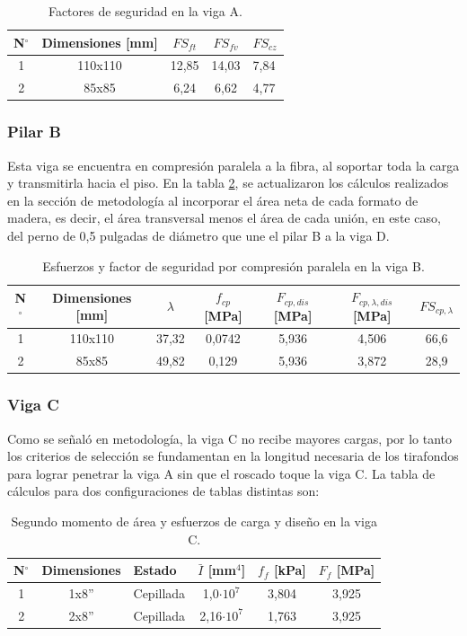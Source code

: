 \begin{table}[H]
\centering
\caption{Factores de seguridad en la viga A.}
\begin{tabular}{@{}ccccl@{}}
\toprule
N$^{\circ}$ & Dimensiones [mm] & $FS_{ft}$ & $FS_{fv}$ & $FS_{cz}$ \\ \midrule
1 & 110x110 & 12,85 & 14,03 & 7,84 \\
2 & 85x85 & 6,24 & 6,62 & 4,77 \\ \bottomrule
\end{tabular}
\label{tab:res_viga_a2}
\end{table}

\subsubsection{Pilar B}
Esta viga se encuentra en compresión paralela a la fibra, al soportar toda la carga y transmitirla hacia el piso. En la tabla \ref{tab:res_viga_b}, se actualizaron los cálculos realizados en la sección de metodología al incorporar el área neta de cada formato de madera, es decir, el área transversal menos el área de cada unión, en este caso, del perno de 0,5 pulgadas de diámetro que une el pilar B a la viga D.

\begin{table}[h]
\centering
\caption{Esfuerzos y factor de seguridad por compresión paralela en la viga B.}
\begin{tabular}{@{}ccccccc@{}}
\toprule
N$^{\circ}$ & Dimensiones [mm] & $\lambda$ & $f_{cp}$ [MPa] & $F_{cp,dis}$ [MPa] & $F_{cp,\lambda,dis}$ [MPa] & $FS_{cp,\lambda}$ \\ \midrule
1 & 110x110 & 37,32 & 0,0742 & 5,936 & 4,506 & 66,6 \\
2 & 85x85 & 49,82 & 0,129 & 5,936 & 3,872 & 28,9 \\ \bottomrule
\end{tabular}
\label{tab:res_viga_b}
\end{table}

\subsubsection{Viga C}
Como se señaló en metodología, la viga C no recibe mayores cargas, por lo tanto los criterios de selección se fundamentan en la longitud necesaria de los tirafondos para lograr penetrar la viga A sin que el roscado toque la viga C. La tabla de cálculos para dos configuraciones de tablas distintas son:

\begin{table}[h]
\centering
\caption{Segundo momento de área y esfuerzos de carga y diseño en la viga C.}
\begin{tabular}{@{}cclccc@{}}
\toprule
N$^{\circ}$ & Dimensiones & Estado & $\bar{I}$ [mm$^4$] & $f_f$ [kPa] & $F_f$ [MPa] \\ \midrule
1 & 1x8'' & Cepillada & 1,0$\cdot 10^7$ & 3,804 & 3,925 \\
2 & 2x8'' & Cepillada & 2,16$\cdot 10^7$ & 1,763 & 3,925 \\ \bottomrule
\end{tabular}
\label{tab:res_viga_c}
\end{table}


